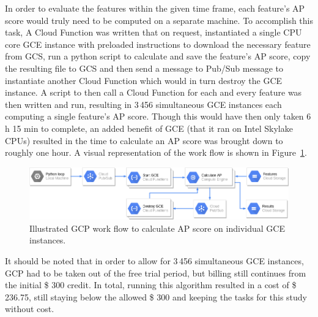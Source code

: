 In order to evaluate the features within the given time frame, each feature's AP score would truly need to be computed on a separate machine.
To accomplish this task, A Cloud Function was written that on request, instantiated a single CPU core GCE instance with preloaded instructions to download the necessary feature from GCS, run a python script to calculate and save the feature's AP score, copy the resulting file to GCS and then send a message to Pub/Sub message to instantiate another Cloud Function which would in turn destroy the GCE instance.
A script to then call a Cloud Function for each and every feature was then written and run, resulting in 3\,456 simultaneous GCE instances each computing a single feature's AP score.
Though this would have then only taken 6 h 15 min to complete, an added benefit of GCE (that it ran on Intel Skylake CPUs) resulted in the time to calculate an AP score was brought down to roughly one hour.
A visual representation of the work flow is shown in Figure~\ref{fig:workflow}.

\begin{figure}[h]
    \centering
    \includegraphics[width=0.9\linewidth]{content/fig/workflow.png}
    \caption{Illustrated GCP work flow to calculate AP score on individual GCE instances.}
    \label{fig:workflow}
\end{figure}

It should be noted that in order to allow for 3\,456 simultaneous GCE instances, GCP had to be taken out of the free trial period, but billing still continues from the initial \$ 300 credit.
In total, running this algorithm resulted in a cost of \$ 236.75, still staying below the allowed \$ 300 and keeping the tasks for this study without cost.